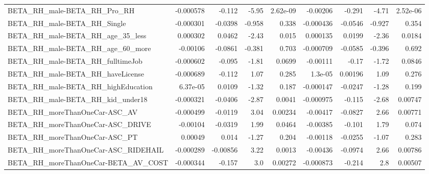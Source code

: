 \begin{tabular}{lrrrrrrrr}
BETA\_RH\_male-BETA\_RH\_Pro\_RH                        &   -0.000578 &       -0.112 &    -5.95 & 2.62e-09 &   -0.00206 &      -0.291 &        -4.71 &      2.52e-06 \\
BETA\_RH\_male-BETA\_RH\_Single                        &   -0.000301 &      -0.0398 &   -0.958 &    0.338 &  -0.000436 &     -0.0546 &       -0.927 &         0.354 \\
BETA\_RH\_male-BETA\_RH\_age\_35\_less                   &    0.000302 &       0.0462 &    -2.43 &    0.015 &   0.000135 &      0.0199 &        -2.36 &        0.0184 \\
BETA\_RH\_male-BETA\_RH\_age\_60\_more                   &    -0.00106 &      -0.0861 &   -0.381 &    0.703 &  -0.000709 &     -0.0585 &       -0.396 &         0.692 \\
BETA\_RH\_male-BETA\_RH\_fulltimeJob                   &   -0.000602 &       -0.095 &    -1.81 &   0.0699 &   -0.00111 &       -0.17 &        -1.72 &        0.0846 \\
BETA\_RH\_male-BETA\_RH\_haveLicense                   &   -0.000689 &       -0.112 &     1.07 &    0.285 &    1.3e-05 &     0.00196 &         1.09 &         0.276 \\
BETA\_RH\_male-BETA\_RH\_highEducation                 &    6.37e-05 &       0.0109 &    -1.32 &    0.187 &  -0.000147 &     -0.0247 &        -1.28 &         0.199 \\
BETA\_RH\_male-BETA\_RH\_kid\_under18                   &   -0.000321 &      -0.0406 &    -2.87 &   0.0041 &  -0.000975 &      -0.115 &        -2.68 &       0.00747 \\
BETA\_RH\_moreThanOneCar-ASC\_AV                      &   -0.000499 &      -0.0119 &     3.04 &  0.00234 &   -0.00417 &     -0.0827 &         2.66 &       0.00771 \\
BETA\_RH\_moreThanOneCar-ASC\_DRIVE                   &    -0.00104 &      -0.0319 &     1.99 &   0.0464 &   -0.00385 &      -0.101 &         1.79 &         0.074 \\
BETA\_RH\_moreThanOneCar-ASC\_PT                      &     0.00049 &        0.014 &    -1.27 &    0.204 &   -0.00118 &     -0.0255 &        -1.07 &         0.283 \\
BETA\_RH\_moreThanOneCar-ASC\_RIDEHAIL                &   -0.000289 &     -0.00856 &     3.22 &   0.0013 &   -0.00436 &     -0.0974 &         2.66 &       0.00786 \\
BETA\_RH\_moreThanOneCar-BETA\_AV\_COST                &   -0.000344 &       -0.157 &      3.0 &  0.00272 &  -0.000873 &      -0.214 &          2.8 &       0.00507 \\

\end{tabular}

